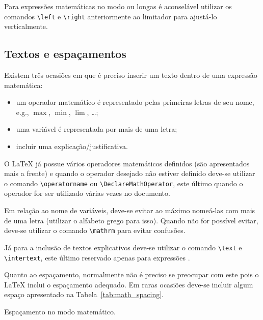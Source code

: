 Para expressões matemáticas no modo  ou longas é aconselável utilizar os comandos \lstinline!\left! e \lstinline!\right! anteriormente ao limitador para ajustá-lo verticalmente. \\

\subsection{Textos e espa\c{c}amentos} \label{sss:math:textos_e_espacamentos}
Existem tr\^{e}s ocasi\~{o}es em que \'{e} preciso inserir um texto dentro de uma express\~{a}o matem\'{a}tica:
\begin{itemize}
    \item um operador matem\'{a}tico \'{e} representado pelas primeiras letras de seu nome, e.g., $\max$, $\min$, $\lim$, \ldots;
    \item uma vari\'{a}vel \'{e} representada por mais de uma letra;
    \item incluir uma explica\c{c}\~{a}o/justificativa.
\end{itemize}

O LaTeX j\'{a} possue v\'{a}rios operadores matem\'{a}ticos definidos (s\~{a}o apresentados mais a frente) e quando o operador desejado n\~{a}o estiver definido deve-se utilizar o comando \lstinline!\operatorname! ou \lstinline!\DeclareMathOperator!, este \'{u}ltimo quando o operador for ser utilizado v\'{a}rias vezes no documento. 

Em rela\c{c}\~{a}o ao nome de vari\'{a}veis, deve-se evitar ao m\'{a}ximo nome\'{a}-las com mais de uma letra (utilizar o alfabeto grego para isso). Quando n\~{a}o for poss\'{i}vel evitar, deve-se utilizar o comando \lstinline!\mathrm! para evitar confus\~{o}es. \\

J\'{a} para a inclusão de textos explicativos deve-se utilizar o comando \lstinline!\text! e \lstinline!\intertext!, este \'{u}ltimo reservado apenas para express\~{o}es . \\

Quanto ao espa\c{c}amento, normalmente n\~{a}o \'{e} preciso se preocupar com este pois o LaTeX inclui o espa\c{c}amento adequado. Em raras ocasi\~{o}es deve-se incluir algum espa\c{c}o apresentado na Tabela~\ref{tab:math_spacing}.
\begin{table}[!htb]
    \centering
    \caption{Espa\c{c}amento no modo matem\'{a}tico.}
    
    \label{tab:math_spacing}
\end{table}

